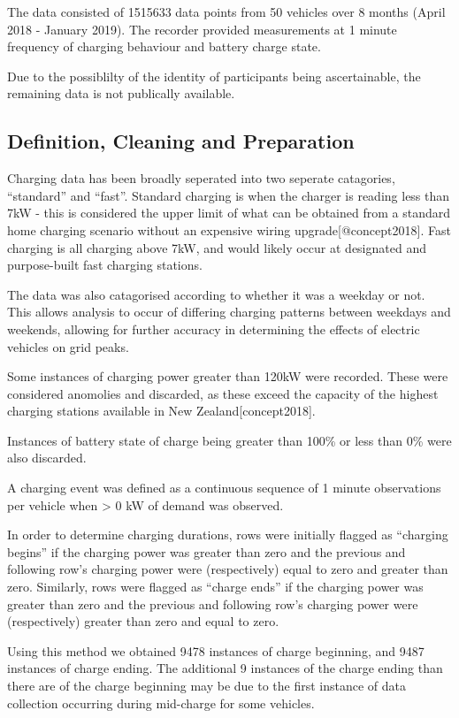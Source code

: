 \documentclass[]{article}
\begin{document}
The data consisted of 1515633 data points from 50 vehicles over 8 months
(April 2018 - January 2019). The recorder provided measurements at 1
minute frequency of charging behaviour and battery charge state.

Due to the possiblilty of the identity of participants being
ascertainable, the remaining data is not publically available.

\subsection{Definition, Cleaning and
Preparation}\label{definition-cleaning-and-preparation}

Charging data has been broadly seperated into two seperate catagories,
``standard'' and ``fast''. Standard charging is when the charger is
reading less than 7kW - this is considered the upper limit of what can
be obtained from a standard home charging scenario without an expensive
wiring upgrade{[}@concept2018{]}. Fast charging is all charging above
7kW, and would likely occur at designated and purpose-built fast
charging stations.

The data was also catagorised according to whether it was a weekday or
not. This allows analysis to occur of differing charging patterns
between weekdays and weekends, allowing for further accuracy in
determining the effects of electric vehicles on grid peaks.

Some instances of charging power greater than 120kW were recorded. These
were considered anomolies and discarded, as these exceed the capacity of
the highest charging stations available in New Zealand{[}concept2018{]}.

Instances of battery state of charge being greater than 100\% or less
than 0\% were also discarded.

A charging event was defined as a continuous sequence of 1 minute
observations per vehicle when \textgreater{} 0 kW of demand was
observed.

In order to determine charging durations, rows were initially flagged as
``charging begins'' if the charging power was greater than zero and the
previous and following row's charging power were (respectively) equal to
zero and greater than zero. Similarly, rows were flagged as ``charge
ends'' if the charging power was greater than zero and the previous and
following row's charging power were (respectively) greater than zero and
equal to zero.

Using this method we obtained 9478 instances of charge beginning, and
9487 instances of charge ending. The additional 9 instances of the
charge ending than there are of the charge beginning may be due to the
first instance of data collection occurring during mid-charge for some
vehicles.
\end{document}
